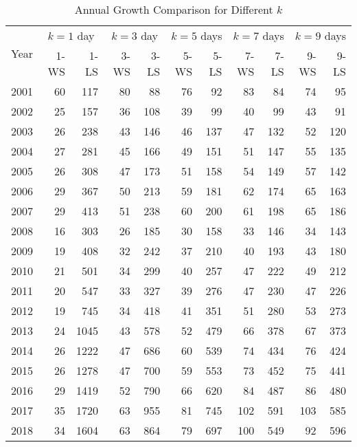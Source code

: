 \documentclass{article}
\begin{document}
\begin{table}[!ht]
    \centering
    \caption{Annual Growth Comparison for Different $k$}
    \medskip
    \begin{tabular}{l | rr| rr| rr| rr| rr}
    \hline
\multirow{2}{*}{Year} & \multicolumn{2}{c|}{$k=1$ day}   
& \multicolumn{2}{c|}{$k=3$ day}  & \multicolumn{2}{c|}{$k=5$ days}   
& \multicolumn{2}{c|}{$k=7$ days}   & \multicolumn{2}{c}{$k=9$ days}\\
 & 1-WS & 1-LS & 3-WS & 3-LS & 5-WS & 5-LS & 7-WS & 7-LS & 9-WS & 9-LS\\
\hline
                2001 & 60 & 117 & 80 & 88 & 76 & 92 & 83 & 84 & 74 & 95 \\ 
        2002 & 25 & 157 & 36 & 108 & 39 & 99 & 40 & 99 & 43 & 91 \\ 
        2003 & 26 & 238 & 43 & 146 & 46 & 137 & 47 & 132 & 52 & 120 \\ 
        2004 & 27 & 281 & 45 & 166 & 49 & 151 & 51 & 147 & 55 & 135 \\ 
        2005 & 26 & 308 & 47 & 173 & 51 & 158 & 54 & 149 & 57 & 142 \\ 
        2006 & 29 & 367 & 50 & 213 & 59 & 181 & 62 & 174 & 65 & 163 \\ 
        2007 & 29 & 413 & 51 & 238 & 60 & 200 & 61 & 198 & 65 & 186 \\ 
        2008 & 16 & 303 & 26 & 185 & 30 & 158 & 33 & 146 & 34 & 143 \\ 
        2009 & 19 & 408 & 32 & 242 & 37 & 210 & 40 & 193 & 43 & 180 \\ 
        2010 & 21 & 501 & 34 & 299 & 40 & 257 & 47 & 222 & 49 & 212 \\ 
        2011 & 20 & 547 & 33 & 327 & 39 & 276 & 47 & 230 & 47 & 226 \\ 
        2012 & 19 & 745 & 34 & 418 & 41 & 351 & 51 & 280 & 53 & 273 \\ 
        2013 & 24 & 1045 & 43 & 578 & 52 & 479 & 66 & 378 & 67 & 373 \\ 
        2014 & 26 & 1222 & 47 & 686 & 60 & 539 & 74 & 434 & 76 & 424 \\ 
        2015 & 26 & 1278 & 47 & 700 & 59 & 553 & 73 & 452 & 75 & 441 \\ 
        2016 & 29 & 1419 & 52 & 790 & 66 & 620 & 84 & 487 & 86 & 480 \\ 
        2017 & 35 & 1720 & 63 & 955 & 81 & 745 & 102 & 591 & 103 & 585 \\ 
        2018 & 34 & 1604 & 63 & 864 & 79 & 697 & 100 & 549 & 92 & 596 \\ 

\end{tabular}
\end{table}
\end{document}
